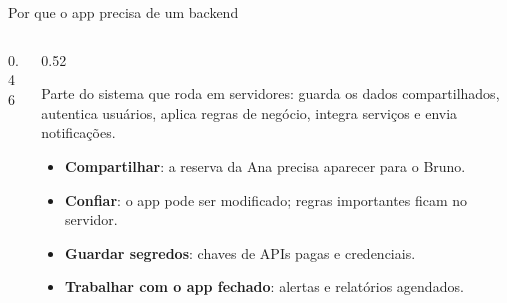 \documentclass[aspectratio=169,10pt]{beamer}
\begin{document}
\begin{frame}{Por que o app precisa de um backend}
  \begin{columns}[c]
    \begin{column}{0.46\textwidth}
      \centering
    \end{column}
    \begin{column}{0.52\textwidth}
      \begin{definicao}[Backend]
        Parte do sistema que roda em servidores: guarda os dados compartilhados, autentica usuários, aplica regras de negócio, integra serviços e envia notificações.
      \end{definicao}
      \begin{conceito}
        \begin{itemize}
          \item \textbf{Compartilhar}: a reserva da Ana precisa aparecer para o Bruno.
          \item \textbf{Confiar}: o app pode ser modificado; regras importantes ficam no servidor.
          \item \textbf{Guardar segredos}: chaves de APIs pagas e credenciais.
          \item \textbf{Trabalhar com o app fechado}: alertas e relatórios agendados.
        \end{itemize}
      \end{conceito}
    \end{column}
  \end{columns}
\end{frame}
\end{document}
